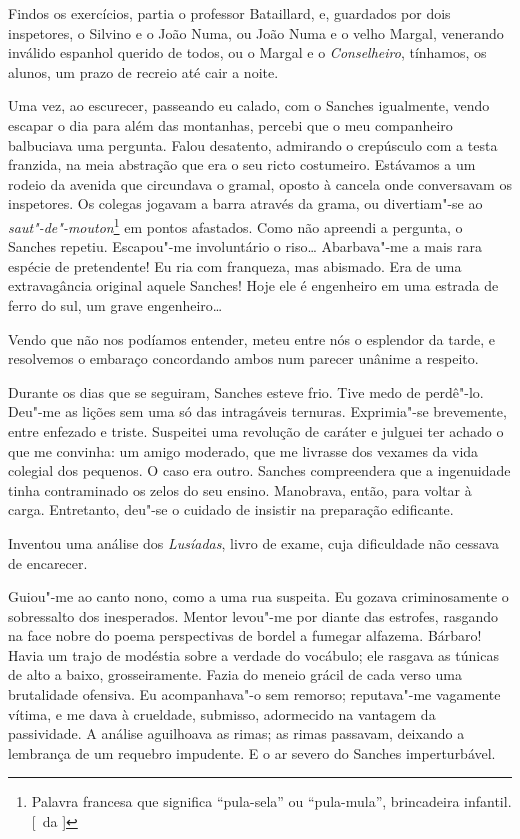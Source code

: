 Findos os exercícios, partia o professor
Bataillard, e, guardados por dois inspetores, o Silvino e o João Numa,
ou João Numa e o velho Margal, venerando inválido espanhol querido de
todos, ou o Margal e o \textit{Conselheiro}, tínhamos, os alunos, um prazo de
recreio até cair a noite. 

Uma vez, ao escurecer, passeando eu calado,
com o Sanches igualmente, vendo escapar o dia para além das montanhas,
percebi que o meu companheiro balbuciava uma pergunta. Falou desatento,
admirando o crepúsculo com a testa franzida, na meia abstração que era
o seu ricto costumeiro. Estávamos a um rodeio da avenida que circundava
o gramal, oposto à cancela onde conversavam os inspetores. Os colegas
jogavam a barra através da grama, ou divertiam"-se ao
\textit{saut"-de"-mouton}\footnote{ Palavra francesa que significa 
``pula-sela'' ou ``pula-mula'', brincadeira infantil. [~da ]} 
em pontos afastados. Como não apreendi a pergunta, o
Sanches repetiu. Escapou"-me involuntário o riso\ldots{} Abarbava"-me a
mais rara espécie de pretendente! Eu ria com franqueza, mas abismado.
Era de uma extravagância original aquele Sanches! Hoje ele é engenheiro
em uma estrada de ferro do sul, um grave engenheiro\ldots{} 

Vendo que não nos podíamos entender, meteu entre nós o esplendor da tarde, e
resolvemos o embaraço concordando ambos num parecer unânime a respeito.

Durante os dias que se seguiram, Sanches esteve frio. Tive medo de
perdê"-lo. Deu"-me as lições sem uma só das intragáveis ternuras.
Exprimia"-se brevemente, entre enfezado e triste. Suspeitei uma
revolução de caráter e julguei ter achado o que me convinha: um amigo
moderado, que me livrasse dos vexames da vida colegial dos pequenos. O
caso era outro. Sanches compreendera que a ingenuidade tinha
contraminado os zelos do seu ensino. Manobrava, então, para voltar à
carga. Entretanto, deu"-se o cuidado de insistir na preparação
edificante. 

Inventou uma análise dos \textit{Lusíadas}, livro de exame, cuja
dificuldade não cessava de encarecer. 

Guiou"-me ao canto nono, como a
uma rua suspeita. Eu gozava criminosamente o sobressalto dos
inesperados. Mentor levou"-me por diante das estrofes, rasgando na
face nobre do poema perspectivas de bordel a fumegar alfazema. Bárbaro!
Havia um trajo de modéstia sobre a verdade do vocábulo; ele rasgava as
túnicas de alto a baixo, grosseiramente. Fazia do meneio grácil de cada
verso uma brutalidade ofensiva. Eu acompanhava"-o sem remorso;
reputava"-me vagamente vítima, e me dava à crueldade, submisso,
adormecido na vantagem da passividade. A análise aguilhoava as rimas;
as rimas passavam, deixando a lembrança de um requebro impudente. E o
ar severo do Sanches imperturbável. 


